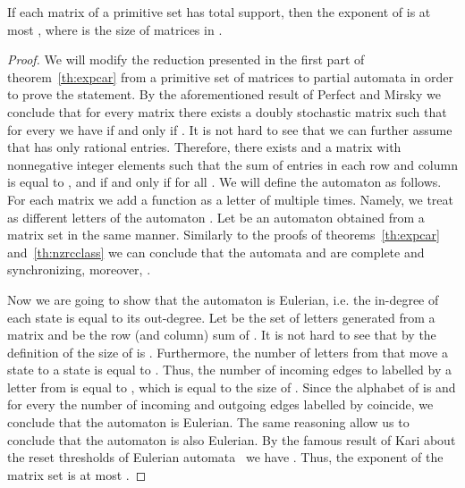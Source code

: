 \documentclass[a4paper,USenglish]{lipics}
\theoremstyle{definition}
\begin{document}
\begin{theorem}
If each matrix of a primitive set  has total support, then the exponent of  is at most , where  is the size of matrices in .
\end{theorem}
\begin{proof}
We will modify the reduction presented in the first part of theorem~\ref{th:expcar} from a primitive set of matrices  to partial automata  in order to prove the statement. By the aforementioned result of Perfect and Mirsky we conclude that for every matrix  there exists a doubly stochastic matrix  such that for every  we have  if and only if . It is not hard to see that we can further assume that  has only rational entries. Therefore, there exists  and a matrix  with nonnegative integer elements such that the sum of entries in each row and column is equal to , and  if and only if  for all .  We will define the automaton  as follows. For each matrix  we add a function  as a letter of  multiple times. Namely, we treat  as  different letters of the automaton . Let  be an automaton obtained from a matrix set  in the same manner. Similarly to the proofs of theorems~\ref{th:expcar} and~\ref{th:nzrcclass} we can conclude that the automata  and  are complete and synchronizing, moreover, .

Now we are going to show that the automaton  is Eulerian, i.e. the in-degree of each state is equal to its out-degree. Let  be the set of letters generated from a matrix  and  be the row (and column) sum of . It is not hard to see that by the definition of  the size of  is . Furthermore, the number of letters from  that move a state  to a state  is equal to . Thus, the number of incoming edges to  labelled by a letter from  is equal to , which is equal to the size of . Since the alphabet of  is  and for every  the number of incoming and outgoing edges labelled by  coincide, we conclude that the automaton  is Eulerian. The same reasoning allow us to conclude that the automaton  is also Eulerian.
By the famous result of Kari about the reset thresholds of Eulerian automata~\cite{Kari2003Eulerian} we have . Thus, the exponent of the matrix set  is at most .
\end{proof}
\end{document}
